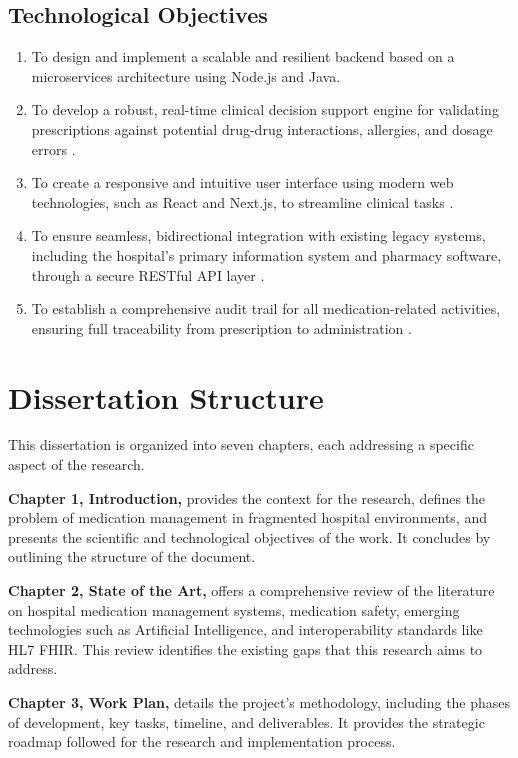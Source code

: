 \subsection{Technological Objectives}
\begin{enumerate}
    \item To design and implement a scalable and resilient backend based on a microservices architecture using Node.js and Java.
    \item To develop a robust, real-time clinical decision support engine for validating prescriptions against potential drug-drug interactions, allergies, and dosage errors \cite{belle2013}.
    \item To create a responsive and intuitive user interface using modern web technologies, such as React and Next.js, to streamline clinical tasks \cite{misra2023}.
    \item To ensure seamless, bidirectional integration with existing legacy systems, including the hospital's primary information system and pharmacy software, through a secure RESTful API layer \cite{mandl2020}.
    \item To establish a comprehensive audit trail for all medication-related activities, ensuring full traceability from prescription to administration \cite{european2016}.
\end{enumerate}

\section{Dissertation Structure}

This dissertation is organized into seven chapters, each addressing a specific aspect of the research.

\textbf{Chapter 1, Introduction,} provides the context for the research, defines the problem of medication management in fragmented hospital environments, and presents the scientific and technological objectives of the work. It concludes by outlining the structure of the document.

\textbf{Chapter 2, State of the Art,} offers a comprehensive review of the literature on hospital medication management systems, medication safety, emerging technologies such as Artificial Intelligence, and interoperability standards like HL7 FHIR. This review identifies the existing gaps that this research aims to address.

\textbf{Chapter 3, Work Plan,} details the project's methodology, including the phases of development, key tasks, timeline, and deliverables. It provides the strategic roadmap followed for the research and implementation process.

